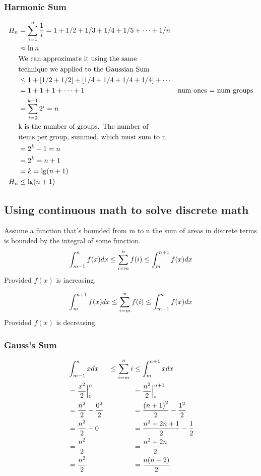 \documentclass[english, 10pt]{article}
\begin{document}
\subsubsection{Harmonic Sum}
\begin{align*}
    H_n &= \sum_{i=1}^{n} \frac{1}{i} = 1+1/2 +1/3 + 1/4 + 1/5 + \cdots + 1/n \\
    &\approx \ln n \\
    &\text{We can approximate it using the same} \\
    &\text{technique we applied to the Gaussian Sum}\\
    &\le 1 + [1/2 + 1/2] + [1/4 + 1/4 + 1/4 + 1/4] + \cdots \\
    &= 1 + 1 + 1 + \cdots + 1 &\text{num ones = num  groups} \\
    &= \sum_{i=0}^{k-1} 2^i =n \\
    &\text{k is the number of groups. The number of} \\
    &\text{items per group, summed, which must sum to n} \\
    &= 2^k -1 =n \\
    &= 2^k = n+1 \\
    &= k= \lg (n+1) \\
    H_n &\le \lg (n+1) \\
\end{align*}

\subsection{Using continuous math to solve discrete math}

Assume a function that's bounded from m to n the sum of areas in discrete terms is bounded by the integral of some function.
$$\int_{m-1}^n f(x) dx \le \sum_{i=m}^{n} f(i) \le \int_{m}^{n+1} f(x) dx$$ Provided $f(x)$ is increasing.

$$\int_{m}^{n+1} f(x) dx \le \sum_{i=m}^{n} f(i) \le \int_{m-1}^{n} f(x) dx$$ Provided $f(x)$ is decreasing.

\subsubsection{Gauss's Sum}
\begin{align*}
    &\int_{m-1}^n x dx &\le \sum_{i=m}^{n} i &\le \int_{m}^{n+1} x dx \\
    &= \frac{x^2}{2} \Big|_0^n  &&= \frac{n^2}{2} \Big|_i^{n+1} \\
    &= \frac{n^2}{2} -\frac{0^2}{2}  &&= \frac{{(n+1)}^2}{2} -\frac{1^2}{2} \\
    &= \frac{n^2}{2}-0  &&= \frac{n^2+2n+1}{2} -\frac{1}{2} \\
    &= \frac{n^2}{2}  &&= \frac{n^2+2n}{2}  \\
    &= \frac{n^2}{2}  &&= \frac{n(n+2)}{2}
\end{align*}
\end{document}
